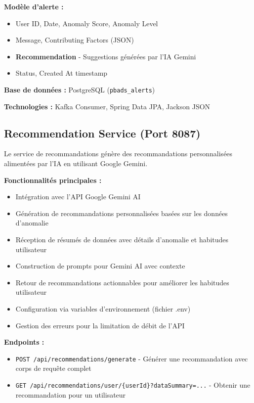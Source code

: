 \textbf{Modèle d'alerte :}
\begin{itemize}
    \item User ID, Date, Anomaly Score, Anomaly Level
    \item Message, Contributing Factors (JSON)
    \item \textbf{Recommendation} - Suggestions générées par l'IA Gemini
    \item Status, Created At timestamp
\end{itemize}

\textbf{Base de données :} PostgreSQL (\texttt{pbads\_alerts})

\textbf{Technologies :} Kafka Consumer, Spring Data JPA, Jackson JSON

\subsection{Recommendation Service (Port 8087)}

Le service de recommandations génère des recommandations personnalisées alimentées par l'IA en utilisant Google Gemini.

\textbf{Fonctionnalités principales :}
\begin{itemize}
    \item Intégration avec l'API Google Gemini AI
    \item Génération de recommandations personnalisées basées sur les données d'anomalie
    \item Réception de résumés de données avec détails d'anomalie et habitudes utilisateur
    \item Construction de prompts pour Gemini AI avec contexte
    \item Retour de recommandations actionnables pour améliorer les habitudes utilisateur
    \item Configuration via variables d'environnement (fichier .env)
    \item Gestion des erreurs pour la limitation de débit de l'API
\end{itemize}

\textbf{Endpoints :}
\begin{itemize}
    \item \texttt{POST /api/recommendations/generate} - Générer une recommandation avec corps de requête complet
    \item \texttt{GET /api/recommendations/user/\{userId\}?dataSummary=...} - Obtenir une recommandation pour un utilisateur
\end{itemize}

